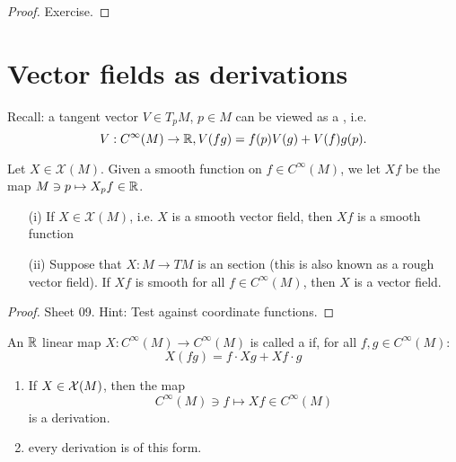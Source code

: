 \begin{proof}
    Exercise.
\end{proof}

\section{Vector fields as derivations}

Recall: a tangent vector \(V\in T_pM\), \(p\in M\) can be viewed as a 
, i.e. \[V:C^\infty(M)\to\mathbb{R},V(fg)=f(p)V(g)+V(f)g(p).\]

 Let \(X\in\mathcal{X}(M)\). Given a smooth function on \(f\in C^\infty(M)\), we 
let \(Xf\) be the map \(M\ni p\mapsto X_p f\in \mathbb{R}\).

\begin{lemma}\label{lem:7.3}
    \begin{enumerate}
        \item[(i)] If \(X\in \mathcal{X}(M)\), i.e. \(X\) is a smooth vector field, then \(Xf\) is a smooth function 
        \item[(ii)] Suppose that \(X:M\to TM\) is an  section (this is also known as a rough vector field). If 
                    \(Xf\) is smooth for all \(f\in C^\infty(M)\), then \(X\) is a  vector field.  
    \end{enumerate}
\end{lemma}

\begin{proof}
    Sheet 09. Hint: Test against coordinate functions. 
\end{proof}

\begin{definition*}
    An \(\mathbb{R}\) linear map \(X:C^\infty(M)\to C^\infty(M)\) is called a  if, for all \(f,g\in C^\infty(M)\): 
    \[X(fg)=f\cdot Xg+Xf\cdot g\]
\end{definition*}

\begin{lemma}\label{lem:7.4}
    \begin{enumerate}
        \item If \(X\in \mathcal{X}(M)\), then the map \[C^\infty(M)\ni f\mapsto Xf\in C^\infty(M)\]
              is a derivation.
        \item every derivation is of this form.
    \end{enumerate}
\end{lemma}

